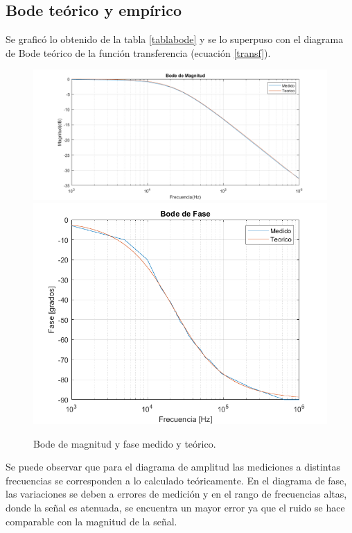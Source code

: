 \subsection{Bode teórico y empírico}
Se graficó lo obtenido de la tabla \ref{tablabode} y se lo superpuso con el diagrama de Bode teórico de la función transferencia (ecuación \ref{transf}).

\begin{figure}[H]
\centering
\includegraphics[scale=0.4]{1-4a.png}
\includegraphics[scale=0.5]{1-4b.png}
\caption{Bode de magnitud y fase medido y teórico.}
\label{diagbode}
\end{figure}

Se puede observar que para el diagrama de amplitud las mediciones a distintas frecuencias se corresponden a lo calculado teóricamente. En el diagrama de fase, las variaciones se deben a errores de medición y en el rango de frecuencias altas, donde la señal es atenuada, se encuentra un mayor error ya que el ruido se hace comparable con la magnitud de la señal.

